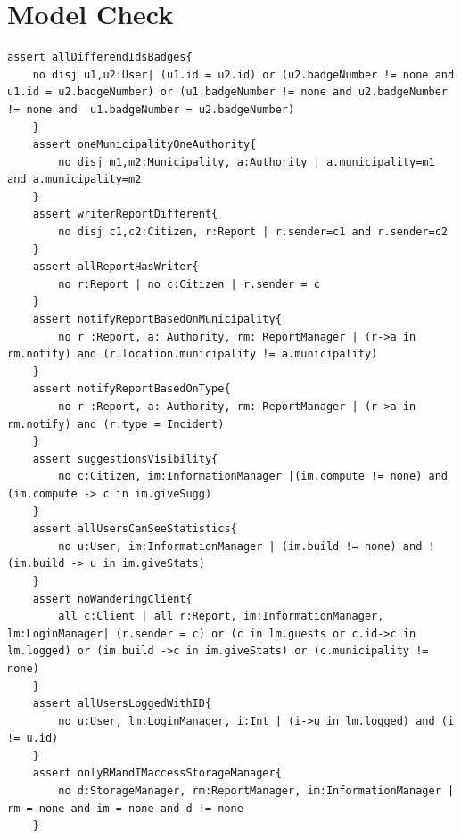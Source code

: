 \documentclass{report}
\begin{document}
\section{Model Check}
\begin{lstlisting}[language=alloy]
	assert allDifferendIdsBadges{
	no disj u1,u2:User| (u1.id = u2.id) or (u2.badgeNumber != none and u1.id = u2.badgeNumber) or (u1.badgeNumber != none and u2.badgeNumber != none and  u1.badgeNumber = u2.badgeNumber)
	}
	assert oneMunicipalityOneAuthority{
		no disj m1,m2:Municipality, a:Authority | a.municipality=m1 and a.municipality=m2
	}
	assert writerReportDifferent{
		no disj c1,c2:Citizen, r:Report | r.sender=c1 and r.sender=c2
	}
	assert allReportHasWriter{
		no r:Report | no c:Citizen | r.sender = c
	}
	assert notifyReportBasedOnMunicipality{
		no r :Report, a: Authority, rm: ReportManager | (r->a in rm.notify) and (r.location.municipality != a.municipality) 
	}
	assert notifyReportBasedOnType{
		no r :Report, a: Authority, rm: ReportManager | (r->a in rm.notify) and (r.type = Incident) 
	}
	assert suggestionsVisibility{
		no c:Citizen, im:InformationManager |(im.compute != none) and (im.compute -> c in im.giveSugg)
	}
	assert allUsersCanSeeStatistics{
		no u:User, im:InformationManager | (im.build != none) and !(im.build -> u in im.giveStats)
	}
	assert noWanderingClient{
		all c:Client | all r:Report, im:InformationManager, lm:LoginManager| (r.sender = c) or (c in lm.guests or c.id->c in lm.logged) or (im.build ->c in im.giveStats) or (c.municipality != none)
	} 
	assert allUsersLoggedWithID{
		no u:User, lm:LoginManager, i:Int | (i->u in lm.logged) and (i != u.id)
	}
	assert onlyRMandIMaccessStorageManager{
		no d:StorageManager, rm:ReportManager, im:InformationManager | rm = none and im = none and d != none
	}
\end{lstlisting}
\end{document}
